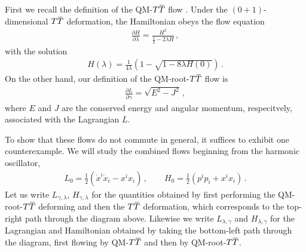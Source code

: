 \documentclass[12pt]{article}
\numberwithin{equation}{section}
\newcommand{\overbar}[1]{\mkern 1.5mu\overline{\mkern-1.5mu#1\mkern-1.5mu}\mkern 1.5mu}
\def\TT{{T\overbar{T}}}
\begin{document}
First we recall the definition of the QM-$\TT$ flow \cite{Gross:2019ach,Gross:2019uxi}. Under the $(0+1)$-dimensional $\TT$ deformation, the Hamiltonian obeys the flow equation
%
\begin{align}\label{QM_TT_Hamiltonian}
    \frac{\partial H}{\partial \lambda} = \frac{H^2}{\frac{1}{2} - 2 \lambda H} \, , 
\end{align}
%
with the solution
%
\begin{align}\label{QM_TT_deformed_hamiltonian}
    H ( \lambda ) = \frac{1}{4 \lambda} \left( 1 - \sqrt{ 1 - 8 \lambda H ( 0 ) } \right) \, .
\end{align}
%
On the other hand, our definition of the QM-root-$\TT$ flow is
%
\begin{align}
    \frac{\partial L}{\partial \gamma} = \sqrt{ E^2 - J^2 } \, ,
\end{align}
%
where $E$ and $J$ are the conserved energy and angular momentum, respecitvely, associated with the Lagrangian $L$.

To show that these flows do not commute in general, it suffices to exhibit one counterexample. We will study the combined flows beginning from the harmonic oscillator,
%
\begin{align}
    L_0 = \frac{1}{2} \left( \dot{x}^i \dot{x}_i - x^i x_i \right) \, , \qquad H_0 = \frac{1}{2} \left( p^i p_i + x^i x_i \right) \, .
\end{align}
%
Let us write $L_{\gamma, \lambda}$, $H_{\gamma, \lambda}$ for the quantities obtained by first performing the QM-root-$\TT$ deforming and then the $\TT$ deformation, which corresponds to the top-right path through the diagram above. Likewise we write $L_{\lambda, \gamma}$ and $H_{\lambda, \gamma}$ for the Lagrangian and Hamiltonian obtained by taking the bottom-left path through the diagram, first flowing by QM-$\TT$ and then by QM-root-$\TT$.
\end{document}
